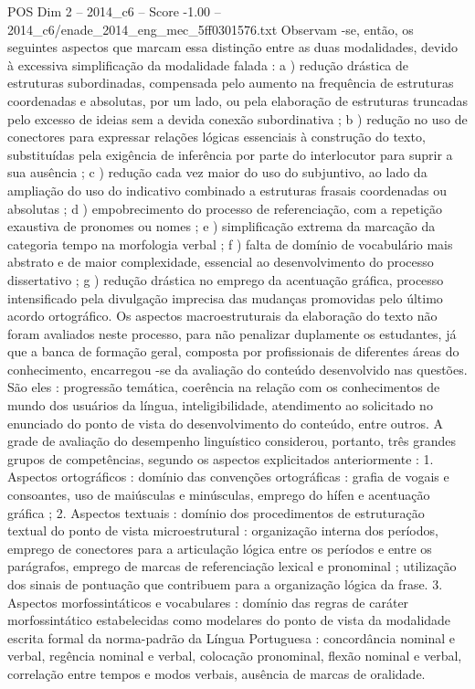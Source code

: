 \begin{textsample}{POS Dim 2 – 2014\_c6 – Score -1.00 – 2014\_c6/enade\_2014\_eng\_mec\_5ff0301576.txt}
Observam -se, então, os seguintes aspectos que marcam essa distinção entre as duas modalidades, devido à excessiva simplificação da modalidade falada : a ) redução drástica de estruturas subordinadas, compensada pelo aumento na frequência de estruturas coordenadas e absolutas, por um lado, ou pela elaboração de estruturas truncadas pelo excesso de ideias sem a devida conexão subordinativa ; b ) redução no uso de conectores para expressar relações lógicas essenciais à construção do texto, substituídas pela exigência de inferência por parte do interlocutor para suprir a sua ausência ; c ) redução cada vez maior do uso do subjuntivo, ao lado da ampliação do uso do indicativo combinado a estruturas frasais coordenadas ou absolutas ; d ) empobrecimento do processo de referenciação, com a repetição exaustiva de pronomes ou nomes ; e ) simplificação extrema da marcação da categoria tempo na morfologia verbal ; f ) falta de domínio de vocabulário mais abstrato e de maior complexidade, essencial ao desenvolvimento do processo dissertativo ; g ) redução drástica no emprego da acentuação gráfica, processo intensificado pela divulgação imprecisa das mudanças promovidas pelo último acordo ortográfico.
Os aspectos macroestruturais da elaboração do texto não foram avaliados neste processo, para não penalizar duplamente os estudantes, já que a banca de formação geral, composta por profissionais de diferentes áreas do conhecimento, encarregou -se da avaliação do conteúdo desenvolvido nas questões.
São eles : progressão temática, coerência na relação com os conhecimentos de mundo dos usuários da língua, inteligibilidade, atendimento ao solicitado no enunciado do ponto de vista do desenvolvimento do conteúdo, entre outros.
A grade de avaliação do desempenho linguístico considerou, portanto, três grandes grupos de competências, segundo os aspectos explicitados anteriormente : 1.
Aspectos ortográficos : domínio das convenções ortográficas : grafia de vogais e consoantes, uso de maiúsculas e minúsculas, emprego do hífen e acentuação gráfica ; 2.
Aspectos textuais : domínio dos procedimentos de estruturação textual do ponto de vista microestrutural : organização interna dos períodos, emprego de conectores para a articulação lógica entre os períodos e entre os parágrafos, emprego de marcas de referenciação lexical e pronominal ; utilização dos sinais de pontuação que contribuem para a organização lógica da frase. 3.
Aspectos morfossintáticos e vocabulares : domínio das regras de caráter morfossintático estabelecidas como modelares do ponto de vista da modalidade escrita formal da norma-padrão da Língua Portuguesa : concordância nominal e verbal, regência nominal e verbal, colocação pronominal, flexão nominal e verbal, correlação entre tempos e modos verbais, ausência de marcas de oralidade.

\end{textsample}
